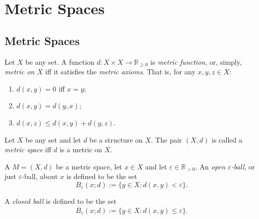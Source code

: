 \tableofcontents



\chapter{Metric Spaces}


\section{Metric Spaces}


\begin{definition}
	\label{definition: metric axioms}
	Let $X$ be any set. A function $d: X \times X \to \mathbb R_{\ge 0}$ is \textit{metric function}, or, simply, \textit{metric on $X$} iff it satisfies the \textit{metric axioms}. That is, for any $x, y, z \in X$:
	\begin{enumerate}[\bf M1. ]
		\item $d(x,y) = 0$ iff $x = y$;
		\item $d(x,y) = d(y,x)$;
		\item $d(x, z) \le d(x,y) + d(y,z)$.
	\end{enumerate}
\end{definition}


\begin{definition}
	\label{definition: metric space}
	Let $X$ be any set and let $d$ be a structure on $X$. The pair $(X, d)$ is called a \textit{metric space} iff $d$ is a metric on $X$.
\end{definition}


\begin{definition}
	\label{definition: ball}
	A $M = (X, d)$ be a metric space, let $x \in X$ and let $\varepsilon \in \mathbb R_{> 0}$. An \textit{open $\varepsilon$-ball}, or just $\varepsilon$-ball, about $x$ is defined to be the set
	$$
	B_\varepsilon (x; d) := \{ y \in X : d(x,y) < \varepsilon \}.
	$$
	
	A \textit{closed ball} is defined to be the set
	$$
	\overline{B}_\varepsilon (x; d) := \{ y \in X : d(x,y) \le \varepsilon \}.
	$$
\end{definition}


